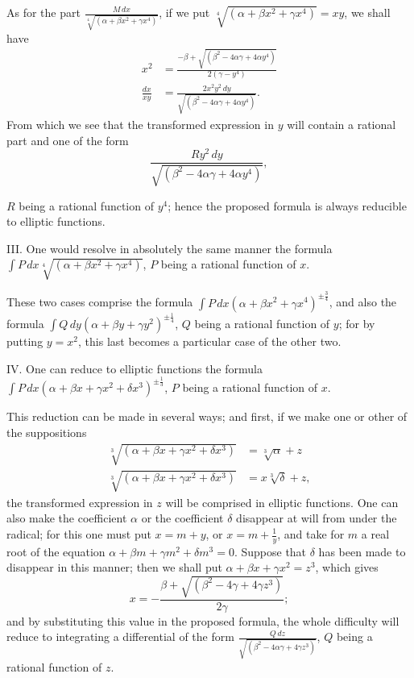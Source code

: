 \documentclass{article}
\begin{document}
As for the part $\frac{M\,dx}{\sqrt[4]{(\alpha+\beta x^{2}+\gamma x^{4})}}$, if we put $\sqrt[4]{(\alpha+\beta x^{2}+\gamma x^{4})}=xy$, we shall have
\[ \begin{aligned} x^{2}&=\frac{-\beta+\sqrt{(\beta^{2}-4\alpha\gamma+4\alpha y^{4})}}{2(\gamma-y^{4})}\\ \frac{dx}{xy}&=\frac{2x^{2}y^{2}\,dy}{\sqrt{(\beta^{2}-4\alpha\gamma+4\alpha y^{4})}}. \end{aligned} \]
From which we see that the transformed expression in $y$ will contain a rational part and one of the form
\[ \frac{Ry^{2}\,dy}{\sqrt{(\beta^{2}-4\alpha\gamma+4\alpha y^{4})}}, \]

$R$ being a rational function of $y^{4}$; hence the proposed formula is always reducible to elliptic functions.

III. One would resolve in absolutely the same manner the formula $\displaystyle\int P\,dx\sqrt[4]{(\alpha+\beta x^{2}+\gamma x^{4})}$, $P$ being a rational function of $x$.

These two cases comprise the formula $\displaystyle\int P\,dx(\alpha+\beta x^{2}+\gamma x^{4})^{\pm\frac{3}{4}}$, and also the formula $\displaystyle\int Q\,dy(\alpha+\beta y+\gamma y^{2})^{\pm\frac{1}{4}}$, $Q$ being a rational function of $y$; for by putting $y=x^{2}$, this last becomes a particular case of the other two.

IV. One can reduce to elliptic functions the formula $\displaystyle\int P\,dx(\alpha+\beta x+\gamma x^{2}+\delta x^{3})^{\pm\frac{1}{3}}$, $P$ being a rational function of $x$.

This reduction can be made in several ways; and first, if we make one or other of the suppositions
\[ \begin{aligned} \sqrt[3]{(\alpha+\beta x+\gamma x^{2}+\delta x^{3})}&=\sqrt[3]{\alpha}+z\\ \sqrt[3]{(\alpha+\beta x+\gamma x^{2}+\delta x^{3})}&=x\sqrt[3]{\delta}+z, \end{aligned} \]
the transformed expression in $z$ will be comprised in elliptic functions. One can also make the coefficient $\alpha$ or the coefficient $\delta$ disappear at will from under the radical; for this one must put $x=m+y$, or $x=m+\frac{1}{y}$, and take for $m$ a real root of the equation $\alpha+\beta m+\gamma m^{2}+\delta m^{3}=0$. Suppose that $\delta$ has been made to disappear in this manner; then we shall put $\alpha+\beta x+\gamma x^{2}=z^{3}$, which gives
\[ x=-\frac{\beta+\sqrt{(\beta^{2}-4\gamma+4\gamma z^{3})}}{2\gamma}; \]
and by substituting this value in the proposed formula, the whole difficulty will reduce to integrating a differential of the form $\frac{Q\,dz}{\sqrt{(\beta^{2}-4\alpha\gamma+4\gamma z^{3})}}$, $Q$ being a rational function of $z$.
\end{document}
